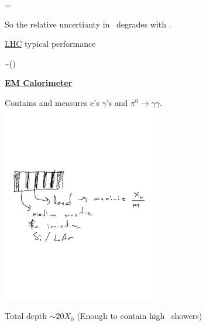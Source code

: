 {\begin{minipage}{0.7\textwidth}
\be
\Rightarrow \Delta {} = 
\ee

So the relative uncertianty in \pt\ degrades with \pt.
\end{minipage}

\underline{LHC} typical performance

\be
\frac{\Delta \pt}{\pt} \sim () 
\ee

\clearpage
\textbf{\underline{EM Calorimeter}}

Contains and measures e's $\gamma$'s and $\pi^0\rightarrow\gamma\gamma$.
\bc
\includegraphics[width=0.5\textwidth]{./EMCalorimeter.pdf}
\ec

Total depth $\sim 20 X_0$ (Enough to contain high \pt\ showers)

}

